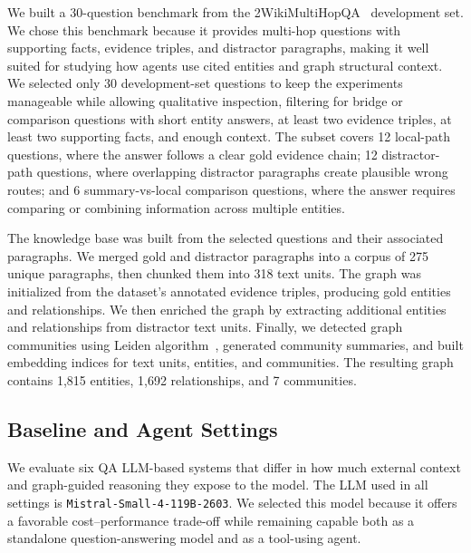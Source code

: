 \documentclass[
]{ceurart}
\begin{document}
We built a 30-question benchmark from the 2WikiMultiHopQA~\cite{ho-etal-2020-constructing} development set. We chose this benchmark because it provides multi-hop questions with supporting facts, evidence triples, and distractor paragraphs, making it well suited for studying how agents use cited entities and graph structural context. We selected only 30 development-set questions to keep the experiments manageable while allowing qualitative inspection, filtering for bridge or comparison questions with short entity answers, at least two evidence triples, at least two supporting facts, and enough context. The subset covers 12 local-path questions, where the answer follows a clear gold evidence chain; 12 distractor-path questions, where overlapping distractor paragraphs create plausible wrong routes; and 6 summary-vs-local comparison questions, where the answer requires comparing or combining information across multiple entities.

The knowledge base was built from the selected questions and their associated paragraphs. We merged gold and distractor paragraphs into a corpus of 275 unique paragraphs, then chunked them into 318 text units. The graph was initialized from the dataset’s annotated evidence triples, producing gold entities and relationships. We then enriched the graph by extracting additional entities and relationships from distractor text units. Finally, we detected graph communities using Leiden algorithm~\cite{traag2019louvain}, generated community summaries, and built embedding indices for text units, entities, and communities. The resulting graph contains 1,815 entities, 1,692 relationships, and 7 communities.

\subsection{Baseline and Agent Settings}

We evaluate six QA LLM-based systems that differ in how much external context and graph-guided reasoning they expose to the model. The LLM used in all settings is \texttt{Mistral-Small-4-119B-2603}. We selected this model because it offers a favorable cost--performance trade-off while remaining capable both as a standalone question-answering model and as a tool-using agent.
\end{document}

